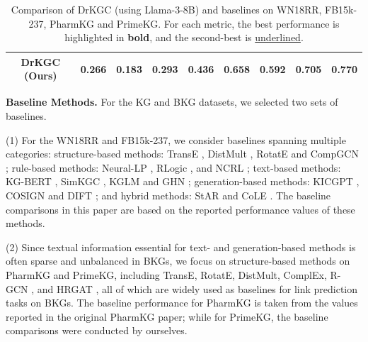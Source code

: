 \documentclass[11pt]{article}
\begin{document}
\begin{table}[!t]
{\begin{tabular}{l|lcccccccc}
\midrule
\multicolumn{2}{c}{DrKGC (Ours)}               & \textbf{0.266}  & \textbf{0.183}  & \textbf{0.293}  & \textbf{0.436}  & \textbf{0.658} & \textbf{0.592} & \textbf{0.705} & \textbf{0.770} \\ 
\bottomrule
\end{tabular}
}
\caption{Comparison of DrKGC (using Llama-3-8B) and baselines on WN18RR, FB15k-237, PharmKG and PrimeKG. For each metric, the best performance is highlighted in \textbf{bold}, and the second-best is \underline{underlined}.}
\label{tab:main_results}
\end{table}


\noindent \textbf{Baseline Methods.}
For the KG and BKG datasets, we selected two sets of baselines.

(1) For the WN18RR and FB15k-237, we consider baselines spanning multiple categories: structure-based methods: TransE \citep{bordes2013translating}, DistMult \citep{yang2014embedding}, RotatE \citep{sun2019rotate} and CompGCN \citep{vashishth2019composition-based}; rule-based methods: Neural-LP \citep{yang2017differentiable}, RLogic \citep{cheng2022rlogic}, and NCRL \citep{cheng2023neuralcompositionalrulelearning}; text-based methods: KG-BERT \citep{yao2019kg}, SimKGC \citep{wang2022simkgc}, KGLM \citep{youn2022kglm} and GHN \citep{qiao-etal-2023-improving}; generation-based methods: KICGPT \citep{wei2024kicgpt}, COSIGN \citep{li2024cosign} and DIFT \citep{liu2024finetuninggenerativelargelanguage}; and hybrid methods: StAR \citep{wang2021structure} and CoLE \citep{10.1145/3511808.3557355}. The baseline comparisons in this paper are based on the reported performance values of these methods.

(2) Since textual information essential for text- and generation-based methods is often sparse and unbalanced in BKGs, we focus on structure-based methods on PharmKG and PrimeKG, including TransE, RotatE, DistMult, ComplEx, R-GCN \citep{schlichtkrull2018modeling}, and HRGAT \citep{10.1145/3545573}, all of which are widely used as baselines for link prediction tasks on BKGs. The baseline performance for PharmKG is taken from the values reported in the original PharmKG \citep{zheng2021pharmkg} paper; while for PrimeKG, the baseline comparisons were conducted by ourselves.
\end{document}
